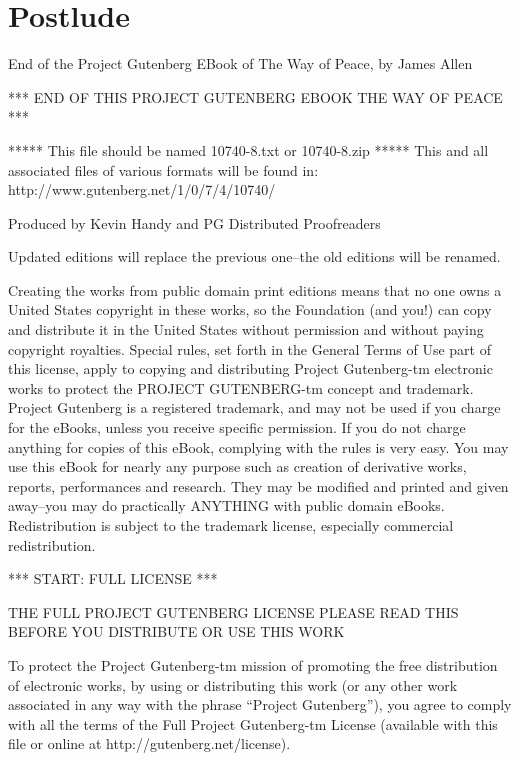\documentclass[12pt,oneside]{scrbook}
\begin{document}
  \section*{Postlude}\label{postlude}
  
  End of the Project Gutenberg EBook of The Way of Peace, by James Allen
  
  *** END OF THIS PROJECT GUTENBERG EBOOK THE WAY OF PEACE ***
  
  ***** This file should be named 10740-8.txt or 10740-8.zip ***** This
  and all associated files of various formats will be found in:
  http://www.gutenberg.net/1/0/7/4/10740/
  
  Produced by Kevin Handy and PG Distributed Proofreaders
  
  Updated editions will replace the previous one--the old editions will be
  renamed.
  
  Creating the works from public domain print editions means that no one
  owns a United States copyright in these works, so the Foundation (and
  you!) can copy and distribute it in the United States without permission
  and without paying copyright royalties. Special rules, set forth in the
  General Terms of Use part of this license, apply to copying and
  distributing Project Gutenberg-tm electronic works to protect the
  PROJECT GUTENBERG-tm concept and trademark. Project Gutenberg is a
  registered trademark, and may not be used if you charge for the eBooks,
  unless you receive specific permission. If you do not charge anything
  for copies of this eBook, complying with the rules is very easy. You may
  use this eBook for nearly any purpose such as creation of derivative
  works, reports, performances and research. They may be modified and
  printed and given away--you may do practically ANYTHING with public
  domain eBooks. Redistribution is subject to the trademark license,
  especially commercial redistribution.
  
  *** START: FULL LICENSE ***
  
  THE FULL PROJECT GUTENBERG LICENSE PLEASE READ THIS BEFORE YOU
  DISTRIBUTE OR USE THIS WORK
  
  To protect the Project Gutenberg-tm mission of promoting the free
  distribution of electronic works, by using or distributing this work (or
  any other work associated in any way with the phrase ``Project
  Gutenberg''), you agree to comply with all the terms of the Full Project
  Gutenberg-tm License (available with this file or online at
  http://gutenberg.net/license).
  
\end{document}
